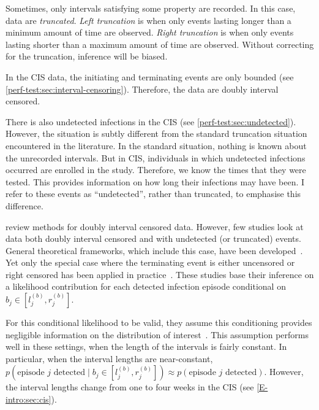 \documentclass[thesis.tex]{subfiles}
\begin{document}
Sometimes, only intervals satisfying some property are recorded.
In this case, data are \emph{truncated}.
\emph{Left truncation} is when only events lasting longer than a minimum amount of time are observed.
\emph{Right truncation} is when only events lasting shorter than a maximum amount of time are observed.
Without correcting for the truncation, inference will be biased.

In the CIS data, the initiating and terminating events are only bounded (see \cref{perf-test:sec:interval-censoring}).
Therefore, the data are doubly interval censored.

There is also undetected infections in the CIS (see \cref{perf-test:sec:undetected}).
However, the situation is subtly different from the standard truncation situation encountered in the literature.
In the standard situation, nothing is known about the unrecorded intervals.
But in CIS, individuals in which undetected infections occurred are enrolled in the study.
Therefore, we know the times that they were tested.
This provides information on how long their infections may have been.
I refer to these events as ``undetected'', rather than truncated, to emphasise this difference.

\Textcite{sunAnalysis,bogaertsSurvival} review methods for doubly interval censored data.
However, few studies look at data both doubly interval censored and with undetected (or truncated) events.
General theoretical frameworks, which include this case, have been developed~\autocite{turnbullEmpirical,dempsterMaximum}.
Yet only the special case where the terminating event is either uncensored or right censored has been applied in practice~\autocite[e.g.][]{sunEmpirical,bacchettiNonparametric,shenNonparametric}.
These studies base their inference on a likelihood contribution for each detected infection episode conditional on $b_j \in [l_j^{(b)}, r_j^{(b)}]$.

For this conditional likelihood to be valid, they assume this conditioning provides negligible information on the distribution of interest~.
This assumption performs well in these settings, when the length of the intervals is fairly constant.
In particular, when the interval lengths are near-constant, $p(\text{episode $j$ detected} \mid b_j \in [l_j^{(b)}, r_j^{(b)}]) \approx p(\text{episode $j$ detected})$.
However, the interval lengths change from one to four weeks in the CIS (see \cref{E-intro:sec:cis}).
\end{document}
